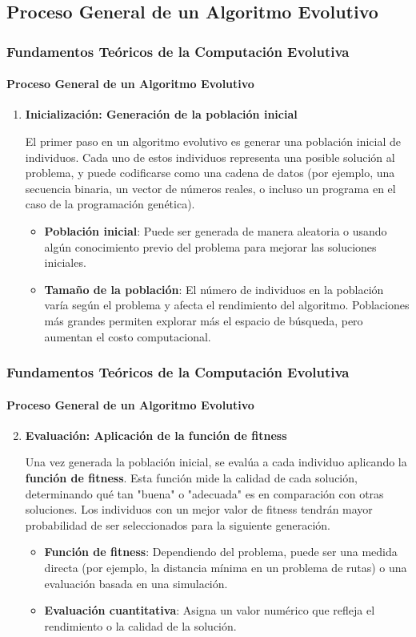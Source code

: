 \documentclass[
	11pt, %
]{beamer}
\begin{document}
\subsection{Proceso General de un Algoritmo Evolutivo}
\begin{frame}
    \frametitle{Fundamentos Teóricos de la Computación Evolutiva}
    \framesubtitle{Proceso General de un Algoritmo Evolutivo}
    \begin{enumerate}
        \item \textbf{Inicialización: Generación de la población inicial}
        
        El primer paso en un algoritmo evolutivo es generar una población inicial de individuos. Cada uno de estos individuos representa una posible solución al problema, y puede codificarse como una cadena de datos (por ejemplo, una secuencia binaria, un vector de números reales, o incluso un programa en el caso de la programación genética).
        
        \begin{itemize}
            \item \textbf{Población inicial}: Puede ser generada de manera aleatoria o usando algún conocimiento previo del problema para mejorar las soluciones iniciales.
            \item \textbf{Tamaño de la población}: El número de individuos en la población varía según el problema y afecta el rendimiento del algoritmo. Poblaciones más grandes permiten explorar más el espacio de búsqueda, pero aumentan el costo computacional.
        \end{itemize}
    \end{enumerate}
\end{frame}

\begin{frame}
    \frametitle{Fundamentos Teóricos de la Computación Evolutiva}
    \framesubtitle{Proceso General de un Algoritmo Evolutivo}
    \begin{enumerate}
    \setcounter{enumi}{1}
        \item \textbf{Evaluación: Aplicación de la función de fitness}
        
        Una vez generada la población inicial, se evalúa a cada individuo aplicando la \textbf{función de fitness}. Esta función mide la calidad de cada solución, determinando qué tan "buena" o "adecuada" es en comparación con otras soluciones. Los individuos con un mejor valor de fitness tendrán mayor probabilidad de ser seleccionados para la siguiente generación.
        
        \begin{itemize}
            \item \textbf{Función de fitness}: Dependiendo del problema, puede ser una medida directa (por ejemplo, la distancia mínima en un problema de rutas) o una evaluación basada en una simulación.
            \item \textbf{Evaluación cuantitativa}: Asigna un valor numérico que refleja el rendimiento o la calidad de la solución.
        \end{itemize}
    \end{enumerate}
\end{frame}
\end{document}
